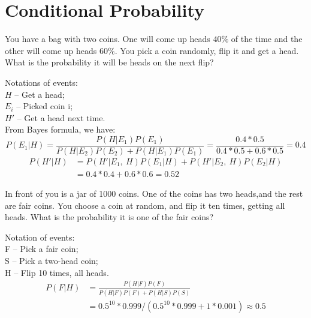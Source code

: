 \section{Conditional Probability}
\begin{exe}
    You have a bag with two coins. One will come up heads $40\%$ of the time and the other will come up heads $60\%$. You pick a coin randomly, flip it and get a head. What is the probability it will be heads on the next flip?
\end{exe}
\begin{teacher}
\begin{sol}
Notations of events:\\
$H$ -- Get a head;\\
$E_i$ -- Picked coin i;\\
$H'$ -- Get a head next time.\\
From Bayes formula, we have:
$$P(E_1|H) = \frac{P(H|E_1) P(E_1)} {P(H|E_2) P(E_2) + P(H|E_1) P(E_1)} = \frac{0.4*0.5}{0.4*0.5 + 0.6*0.5}= 0.4$$
\begin{equation*} \label{1}
\begin{split}
P(H'|H) & = P(H'|E_1,\ H)P(E_1|H) + P(H'|E_2,\ H)P(E_2|H) \\
 & = 0.4*0.4 + 0.6*0.6 = 0.52
\end{split}
\end{equation*} 
\end{sol}
\end{teacher}

\begin{exe}
In front of you is a jar of 1000 coins. One of the coins has two heads,and the rest are fair coins. You choose a coin at random, and flip it ten times, getting all heads. What is the probability it is one of the fair coins?
\end{exe}
\begin{teacher}
\begin{sol} 
Notation of events:\\
F -- Pick a fair coin;\\
S -- Pick a two-head coin;\\
H -- Flip 10 times, all heads.\\
\begin{equation*}
\begin{split}
    P(F|H) &= \frac{P(H|F)P(F)}{P(H|F)P(F) + P(H|S)P(S)}\\
    & = 0.5^{10}*0.999/(0.5^{10}*0.999+1*0.001) \approx 0.5
\end{split}
\end{equation*}
\end{sol}
\end{teacher}

